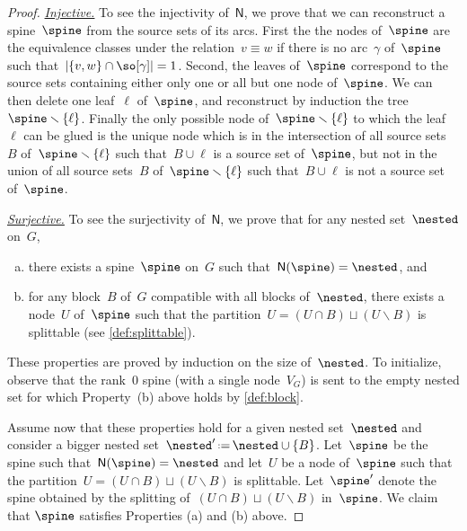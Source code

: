 \documentclass{amsart}
\theoremstyle{definition}
\newcommand{\ssm}{\smallsetminus} %
\newcommand{\eqdef}{\mbox{\,\raisebox{0.2ex}{\scriptsize\ensuremath{\mathrm:}}\ensuremath{=}\,}} %
\newcommand{\para}[1]{\medskip\noindent\uline{\textit{#1.}}} %
\newcommand{\spineToNested}{\mathsf{N}} %
\begin{document}
\begin{proof}
  \para{Injective}
  To see the injectivity of~$\spineToNested$, we prove that we can reconstruct a spine~$\spine$ from the source sets of its arcs.
  First the the nodes of~$\spine$ are the equivalence classes under the relation~$v \equiv w$ if there is no arc~$\gamma$ of~$\spine$ such that~$|\{v,w\} \cap \so[\gamma]| = 1$.
  Second, the leaves of~$\spine$ correspond to the source sets containing either only one or all but one node of~$\spine$. 
  We can then delete one leaf~$\ell$ of~$\spine$, and reconstruct by induction the tree~$\spine \ssm \{\ell\}$. 
  Finally the only possible node of~$\spine \ssm \{\ell\}$ to which the leaf~$\ell$ can be glued is the unique node which is in the intersection of all source sets~$B$ of~$\spine \ssm \{\ell\}$ such that~$B \cup \ell$ is a source set of~$\spine$, but not in the union of all source sets~$B$ of~$\spine \ssm \{\ell\}$ such that~$B \cup \ell$ is not a source set of~$\spine$.

  \para{Surjective}
  To see the surjectivity of~$\spineToNested$, we prove that for any nested set~$\nested$ on~$G$,
\begin{enumerate}[(a)]
\item there exists a spine~$\spine$ on~$G$ such that~$\spineToNested(\spine) = \nested$, and
\item for any block~$B$ of~$G$ compatible with all blocks of~$\nested$, there exists a node~$U$ of~$\spine$ such that the partition~$U = (U \cap B) \sqcup (U \ssm B)$ is splittable (see \cref{def:splittable}).
\end{enumerate}
  These properties are proved by induction on the size of~$\nested$.  
  To initialize, observe that the rank~$0$ spine (with a single node~$V_G$) is sent to the empty nested set for which Property~(b) above holds by \cref{def:block}.

  Assume now that these properties hold for a given nested set~$\nested$ and consider a bigger nested set~$\nested' \eqdef \nested \cup \{B\}$.
  Let~$\spine$ be the spine such that~$\spineToNested(\spine) = \nested$ and let~$U$ be a node of~$\spine$ such that the partition~$U = (U \cap B) \sqcup (U \ssm B)$ is splittable.
  Let~$\spine'$ denote the spine obtained by the splitting of~$(U \cap B) \sqcup (U \ssm B)$ in~$\spine$.
  We claim that $\spine$ satisfies Properties (a) and (b) above.
  

\end{proof}
\end{document}
